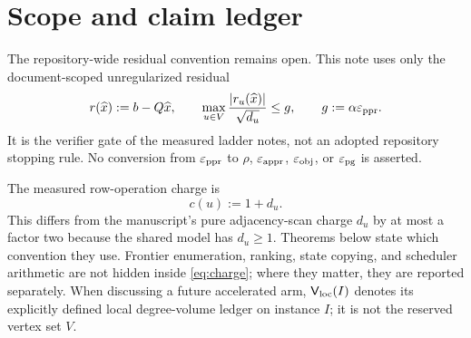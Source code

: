 \section{Scope and claim ledger}
\label{sec:scope}



The repository-wide residual convention remains open.  This note uses only
the document-scoped unregularized residual
\begin{equation}
 r(\widehat x):=b-Q\widehat x,
 \qquad
 \max_{u\in V}\frac{\left\lvert r_u(\widehat x) \right\rvert}{\sqrt{d_u}}
 \leq g,
 \qquad g:=\alpha\varepsilon_{\mathrm{ppr}}.
 \label{eq:note-gate}
\end{equation}
It is the verifier gate of the measured ladder notes, not an adopted
repository stopping rule.  No conversion from $\varepsilon_{\mathrm{ppr}}$ to $\rho$,
$\varepsilon_{\mathrm{appr}}$, $\varepsilon_{\mathrm{obj}}$, or $\varepsilon_{\mathrm{pg}}$ is asserted.

The measured row-operation charge is
\begin{equation}
 c(u):=1+d_u.
 \label{eq:charge}
\end{equation}
This differs from the manuscript's pure adjacency-scan charge $d_u$ by at
most a factor two because the shared model has $d_u\geq1$.  Theorems below
state which convention they use.  Frontier enumeration, ranking, state
copying, and scheduler arithmetic are not hidden inside \eqref{eq:charge};
where they matter, they are reported separately.
When discussing a future accelerated arm, $\mathsf V_{\rm loc}(I)$ denotes
its explicitly defined local degree-volume ledger on instance $I$; it is not
the reserved vertex set $V$.

